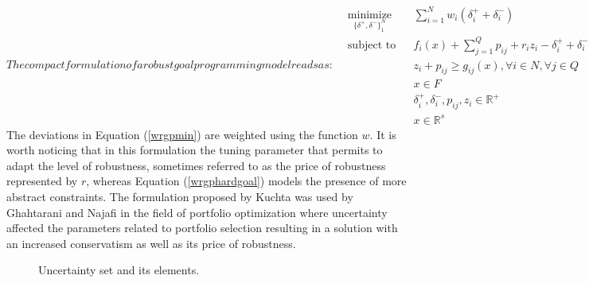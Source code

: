 \documentclass[conference,final,]{IEEEtran}
\begin{document}
\begin{subequations}
The compact formulation of a robust goal programming model reads as:
\begin{align}
    & \underset{\{\delta^+,\delta^-\}^N_1}{\text{minimize}} & & \sum^N_{i=1}w_i (\delta^+_i + \delta^-_i)  \label{wrgpmin} \\
    & \text{subject to} & & f_i(x) + \sum_{j=1}^{Q}p_{ij} + r_iz_i - \delta^+_i + \delta^-_i = b_i, \forall i \in N  \label{wrgpsoftgoal} \\
    & & & z_i + p_{ij} \geq g_{ij}(x), \forall i \in N , \forall j \in Q \label{wrgptuning} \\
    & & & x\in F \label{wrgphardgoal} \\
    & & & \delta^+_i,\delta^-_i, p_{ij}, z_i \in \mathbb{R}^{+} \label{wrgppositivity} \\
    & & & x \in \mathbb{R}^{s} \label{wrgpfeasible}
\end{align}
\end{subequations}
The deviations in Equation (\ref{wrgpmin}) are weighted using the function $w$. It is worth noticing that in this formulation the tuning parameter that permits to adapt the level of robustness, sometimes referred to as the price of robustness \cite{bertsimas04} represented by \(r\), whereas Equation (\ref{wrgphardgoal}) models the presence of more abstract constraints. The formulation proposed by Kuchta was used by Ghahtarani and Najafi in the field of portfolio optimization \cite{ghahtarani13} where uncertainty affected the parameters related to portfolio selection resulting in a solution with an increased conservatism as well as its price of robustness.
\begin{figure}[]
\centering
{}
\caption{Uncertainty set and its elements.}
\label{u-set}
\end{figure}
\end{document}
